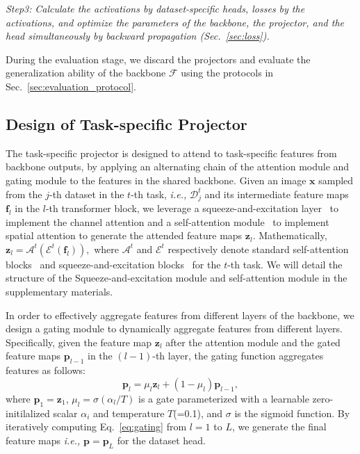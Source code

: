 \documentclass[10pt,twocolumn,letterpaper]{article}
\begin{document}
\emph{Step3:} \emph{Calculate the activations by dataset-specific heads, losses by the activations, and optimize the parameters of the backbone, the projector, and the head simultaneously by backward propagation (Sec.~\ref{sec:loss}).}

During the evaluation stage, we discard the projectors and evaluate the generalization ability of the backbone $\mathcal{F}$ using the protocols in Sec.~\ref{sec:evaluation_protocol}.





\subsection{Design of Task-specific Projector} \label{sec:projector_design}
The task-specific projector is designed to attend to task-specific features from backbone outputs, by applying an alternating chain of the attention module and gating module to the features in the shared backbone. Given an image $\mathbf{x}$ sampled from the $j$-th dataset in the $t$-th task, \emph{i.e.,} $\mathcal{D}^t_j$ and its intermediate feature maps $\mathbf{f}_l$ in the $l$-th transformer block, we leverage a squeeze-and-excitation layer~\cite{hu2018squeeze} to implement the channel attention and a self-attention module~\cite{vaswani2017attention} to implement spatial attention to generate the attended feature maps $\mathbf{z}_l$. Mathematically, $\mathbf{z}_l = \mathcal{A}^t(\mathcal{E}^t(\mathbf{f}_l)),$
where $\mathcal{A}^t$ and $\mathcal{E}^t$ respectively denote standard self-attention blocks~\cite{vaswani2017attention} and squeeze-and-excitation blocks~\cite{hu2018squeeze} for the $t$-th task. We will detail the structure of the Squeeze-and-excitation module and self-attention module in the supplementary materials.

In order to effectively aggregate features from different layers of the backbone, we design a gating module to dynamically aggregate features from different layers. Specifically, given the feature map $\mathbf{z}_l$ after the attention module and the gated feature maps $\mathbf{p}_{l-1}$ in the $(l-1)$-th layer, the gating function aggregates features as follows:
\begin{equation} \label{eq:gating}
    \mathbf{p}_l = \mu_l \mathbf{z}_l + (1-\mu_l) \mathbf{p}_{l-1},
\end{equation}
where $\mathbf{p}_1=\mathbf{z}_1$,  $\mu_l = \sigma(\alpha_l/T)$ is a gate parameterized with a learnable zero-initilalized scalar $\alpha_i$ and temperature $T$(=0.1), and $\sigma$ is the sigmoid function. By iteratively computing Eq.~\ref{eq:gating} from $l=1$ to $L$, we generate the final feature maps \emph{i.e.,} $\mathbf{p}=\mathbf{p}_L$ for the dataset head.  
\end{document}
